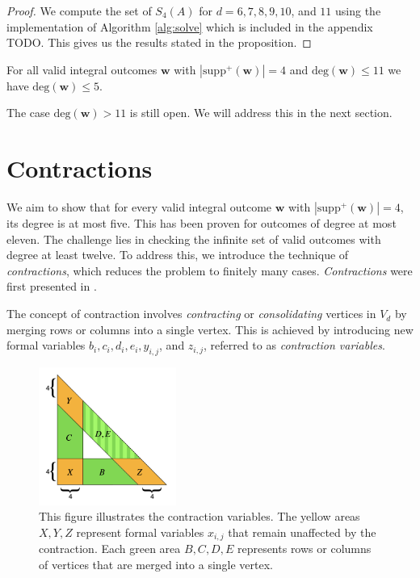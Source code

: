 \begin{proof}
    We compute the set of \( S_4(A) \) for \( d = 6,7,8,9,10 \), and \( 11 \) using the implementation of Algorithm \ref{alg:solve} which is included in the appendix TODO. This gives us the results stated in the proposition. 
\end{proof}

\begin{corollary}
    For all valid integral outcomes \( \mathbf w \) with \( |\mathrm{supp}^+(\mathbf w)| = 4 \) and \( \mathrm{deg}(\mathbf{w}) \leq 11 \) we have \( \mathrm{deg}(\mathbf w) \leq 5 \).
\end{corollary}

The case \( \mathrm{deg}(\mathbf{w}) > 11 \) is still open. We will address this in the next section.

\section{Contractions}

We aim to show that for every valid integral outcome \( \mathbf{w} \) with \( |\mathrm{supp}^+(\mathbf{w})| = 4 \), its degree is at most five. This has been proven for outcomes of degree at most eleven. The challenge lies in checking the infinite set of valid outcomes with degree at least twelve. To address this, we introduce the technique of \emph{contractions}, which reduces the problem to finitely many cases. \emph{Contractions} were first presented in \cite{bik2022classifying}.

The concept of contraction involves \emph{contracting} or \emph{consolidating} vertices in \( V_d \) by merging rows or columns into a single vertex. This is achieved by introducing new formal variables \( b_{i}, c_{i}, d_{i}, e_{i}, y_{i,j} \), and \( z_{i,j} \), referred to as \emph{contraction variables}.

\begin{figure}[H]
    \centering
    \includegraphics[width=0.4\textwidth]{assets/contactions-4.png}
    \caption{This figure illustrates the contraction variables. The yellow areas \( X, Y, Z \) represent formal variables \( x_{i,j} \) that remain unaffected by the contraction. Each green area \( B, C, D, E \) represents rows or columns of vertices that are merged into a single vertex.}\label{fig:contractions-42342432}
\end{figure}

